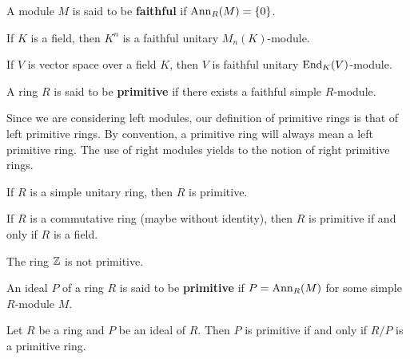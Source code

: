 
\begin{definition}
A module $M$ is said to be \textbf{faithful} if $\operatorname{Ann}_R(M)=\{0\}$. 
\end{definition}

\begin{example}
	If $K$ is a field, then $K^n$ is a faithful unitary $M_n(K)$-module.
\end{example}

\begin{example}
	If $V$ is vector space over a field $K$, then $V$ is faithful unitary $\operatorname{End}_K(V)$-module.
\end{example}

\begin{definition}
A ring $R$ is said to be \textbf{primitive} if there exists a faithful simple $R$-module.  
\end{definition}

Since 
we are considering left modules, our definition of primitive rings is that of left primitive rings.
By convention, a primitive ring
will always mean a left primitive ring. 
The use 
of right modules yields to the notion of right primitive rings.  

\begin{exercise}
	\label{xca:simple=>prim}
	If $R$ is a simple unitary ring, then $R$ is primitive. 
\end{exercise}

\begin{exercise}
	\label{xca:prim+conm=cuerpo}
	If $R$ is a commutative ring (maybe without identity), then $R$ is primitive if and only if $R$ is a field. 
\end{exercise}

\begin{example}
	The ring $\mathbb{Z}$ is not primitive. 
\end{example}

\begin{definition}
An ideal $P$ of a ring $R$ is said to be \textbf{primitive} if $P=\operatorname{Ann}_R(M)$
for some simple $R$-module $M$. 
\end{definition}

\begin{lemma}
	\label{lemma:primitivo}
	Let $R$ be a ring and $P$ be an ideal of $R$. Then $P$ is primitive if and only if 
	$R/P$ is a primitive ring.
\end{lemma}

